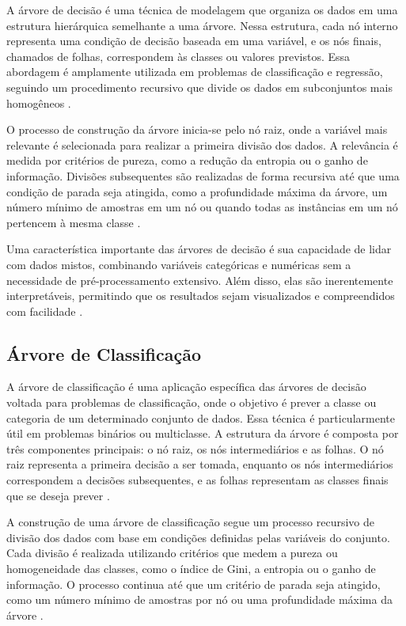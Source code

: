 A árvore de decisão é uma técnica de modelagem que organiza os dados em uma estrutura hierárquica semelhante a uma árvore. Nessa estrutura, cada nó interno representa uma condição de decisão baseada em uma variável, e os nós finais, chamados de folhas, correspondem às classes ou valores previstos. Essa abordagem é amplamente utilizada em problemas de classificação e regressão, seguindo um procedimento recursivo que divide os dados em subconjuntos mais homogêneos \cite{breiman1984classification}.

O processo de construção da árvore inicia-se pelo nó raiz, onde a variável mais relevante é selecionada para realizar a primeira divisão dos dados. A relevância é medida por critérios de pureza, como a redução da entropia ou o ganho de informação. Divisões subsequentes são realizadas de forma recursiva até que uma condição de parada seja atingida, como a profundidade máxima da árvore, um número mínimo de amostras em um nó ou quando todas as instâncias em um nó pertencem à mesma classe \cite{quinlan1986induction}.

Uma característica importante das árvores de decisão é sua capacidade de lidar com dados mistos, combinando variáveis categóricas e numéricas sem a necessidade de pré-processamento extensivo. Além disso, elas são inerentemente interpretáveis, permitindo que os resultados sejam visualizados e compreendidos com facilidade \cite{breiman1984classification}.

\subsection{Árvore de Classificação}

A árvore de classificação é uma aplicação específica das árvores de decisão voltada para problemas de classificação, onde o objetivo é prever a classe ou categoria de um determinado conjunto de dados. Essa técnica é particularmente útil em problemas binários ou multiclasse. A estrutura da árvore é composta por três componentes principais: o nó raiz, os nós intermediários e as folhas. O nó raiz representa a primeira decisão a ser tomada, enquanto os nós intermediários correspondem a decisões subsequentes, e as folhas representam as classes finais que se deseja prever \cite{quinlan1986induction}.

A construção de uma árvore de classificação segue um processo recursivo de divisão dos dados com base em condições definidas pelas variáveis do conjunto. Cada divisão é realizada utilizando critérios que medem a pureza ou homogeneidade das classes, como o índice de Gini, a entropia ou o ganho de informação. O processo continua até que um critério de parada seja atingido, como um número mínimo de amostras por nó ou uma profundidade máxima da árvore \cite{breiman1984classification}.

